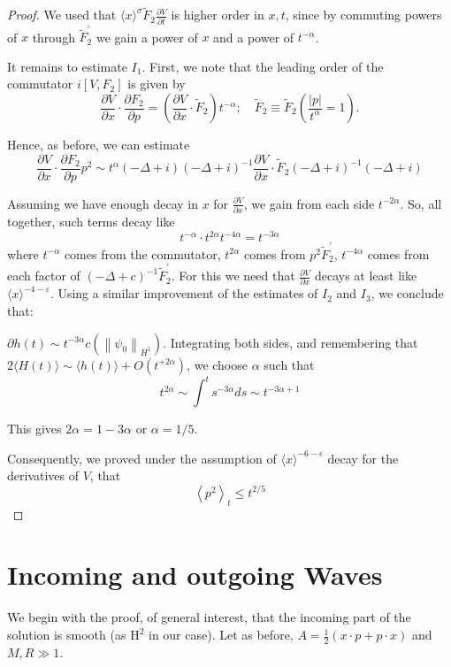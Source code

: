 \documentclass[11pt]{article}
\begin{document}
\begin{proof}
We used that
$\langle x\rangle^{\sigma} \tilde{F}_{2} \frac{\partial V}{\partial t}$ is higher order in $x,t$, since by commuting powers of $x$ through $\tilde{F}_{2}^{\prime}$ we gain a power of $x$ and a power of $t^{-\alpha}$.

It remains to estimate $I_{1}$.
First, we note that the leading order of the commutator $i\left[V, F_{2}\right]$ is given by
$$
\frac{\partial V}{\partial x} \cdot \frac{\partial F_{2}}{\partial p}=\left(\frac{\partial V}{\partial x} \cdot  \tilde F_{2}\right) t^{-\alpha}; \quad \tilde F_2\equiv \tilde F_2(\frac{|p|}{t^{\alpha}}=1).
$$

Hence, as before, we can estimate
$$
\frac{\partial V}{\partial x} \cdot \frac{\partial F_{2}}{\partial p}  p^{2} \sim t^{\alpha}(-\Delta+i)(-\Delta+i)^{-1} \frac{\partial V}{\partial x} \cdot \tilde F_{2}(-\Delta+i)^{-1}(-\Delta+i)
$$

Assuming we have enough decay in $x$ for $\frac{\partial V}{\partial x}$, we gain from each side $t^{-2 \alpha}$.
So, all together, such terms decay like
$$
t^{-\alpha} \cdot t^{2 \alpha} t^{-4 \alpha}=t^{-3 \alpha}
$$
where $t^{-\alpha}$ comes from the commutator, $t^{2 \alpha}$ comes from $p^{2} \tilde{F}_{2}^{\prime}$,
$t^{-4 \alpha}$ comes from each factor of $(-\Delta+c)^{-1} \tilde{F}_{2}^{\prime}$.
For this we need that $\frac{\partial V}{\partial x}$ decays at least like $\langle x\rangle^{-4-\varepsilon}$.
Using a similar improvement of the estimates of $I_{2}$ and $I_{3}$, we conclude that:

$\partial h(t) \sim t^{-3 \alpha} c\left(\left\|\psi_{0}\right\|_{H^1}\right)$.
Integrating both sides, and remembering that
$2\langle H(t)\rangle \sim \langle h(t)\rangle +O\left(t^{+2 \alpha}\right)$, we choose $\alpha$ such that
$$
t^{2 \alpha} \sim \int^{t} s^{-3 \alpha} d s \sim t^{-3 \alpha+1}
$$

This gives $2 \alpha=1-3 \alpha$ or $\alpha=1 / 5$.

Consequently, we proved under the assumption of $\langle x\rangle^{-6-\epsilon}$ decay for the derivatives of $V$, that
$$
\left\langle p^{2}\right\rangle_{t} \leqslant t^{2 / 5}
$$
\end{proof}
\section { Incoming and outgoing Waves}
We begin with the proof, of general interest, that the incoming part of the solution is smooth (as $\mathrm{H}^{2}$ in our case).
Let as before, $A=\frac{1}{2}(x \cdot p+p \cdot x)$ and $M, R \gg 1$. 
\end{document}
